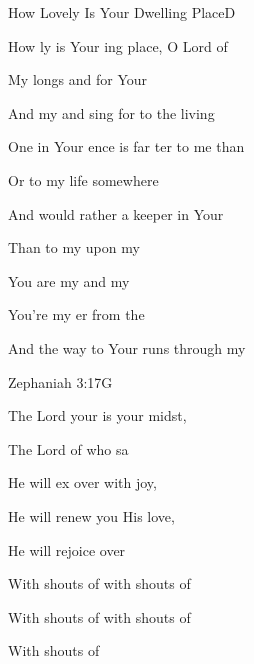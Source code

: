 \documentclass[12pt]{book}
\newcommand{\RevDate}{\today}
\newcommand{\NotCCLIed}{\relax}
\begin{document}
\begin{song}{How Lovely Is Your Dwelling Place}{D}
  {}
  {}
  {}
  {\NotCCLIed}

  \renewcommand{\RevDate}{February~11,~1993}

  \begin{SBOpGroup}
    How ly is Your ing place,  O Lord of 
    
    My  longs and  for Your 
    
    And my  and  sing for  to the living   
    
    One  in Your ence is far ter to me than 
    
    Or to  my  life somewhere  
    
    And  would rather  a  keeper in Your 
    
    Than to  my  upon my 
    
    You are my  and my 
    
    You're my er from the 
    
    And the way to Your  runs through my  
  \end{SBOpGroup}
\end{song}


\begin{song}{Zephaniah 3:17}{G}
  {}
  {}
  {}
  {\NotCCLIed}

  \renewcommand{\RevDate}{February~11,~1993}

  \begin{SBOpGroup}
     The Lord your  is  your midst,
    
     The Lord of  who sa
    
     He will ex over  with joy,
    
     He will renew you  His love,
    
     He will rejoice over 
    
    With shouts of    with shouts of   
    
    With shouts of   with shouts of  
    
    With shouts of 
  \end{SBOpGroup}
\end{song}
\end{document}
